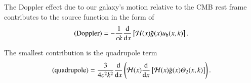     The Doppler effect due to our galaxy's motion relative to the CMB rest frame contributes to the source function in the form of
    \begin{equation}
        \text{(Doppler)} = - \frac{1}{ck} \dv{}{x} \left[\mathcal{H}(x) \tilde{g}(x) u_\mathrm{b}(x,k) \right].
    \end{equation}

    The smallest contribution is the quadrupole term 
    \begin{equation}
        \text{(quadrupole)} =  \frac{3}{4c^2k^2} \dv{}{x} \left(\mathcal{H}(x) \dv{}{x} \left[ \mathcal{H}(x) \tilde{g}(x) \varTheta_2(x,k) \right] \right).
    \end{equation}
